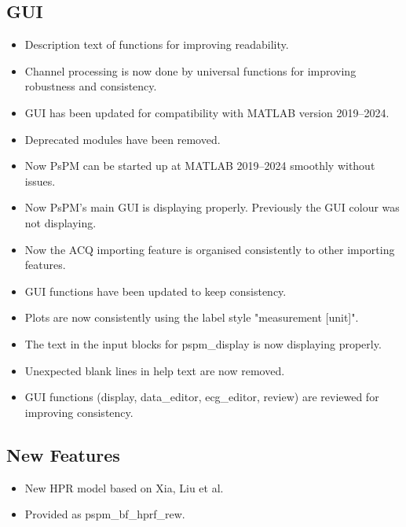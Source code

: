 \documentclass[english]{article}
\numberwithin{equation}{section}
\numberwithin{figure}{section}
\begin{document}
\subsection*{GUI}

\begin{itemize}
\item Description text of functions for improving readability.

\item Channel processing is now done by universal functions for improving robustness and consistency.

\item GUI has been updated for compatibility with MATLAB version 2019--2024.

\item Deprecated modules have been removed.

\item Now PsPM can be started up at MATLAB 2019--2024 smoothly without issues.

\item Now PsPM's main GUI is displaying properly. Previously the GUI colour was not displaying.

\item Now the ACQ importing feature is organised consistently to other importing features.

\item GUI functions have been updated to keep consistency.

\item Plots are now consistently using the label style "measurement [unit]".

\item The text in the input blocks for pspm\_display is now displaying properly.

\item Unexpected blank lines in help text are now removed.

\item GUI functions (display, data\_editor, ecg\_editor, review) are reviewed for improving consistency.
\end{itemize}

\subsection*{New Features}

\begin{itemize}
\item New HPR model based on Xia, Liu et al.

\item Provided as pspm\_bf\_hprf\_rew.
\end{itemize}
\end{document}
